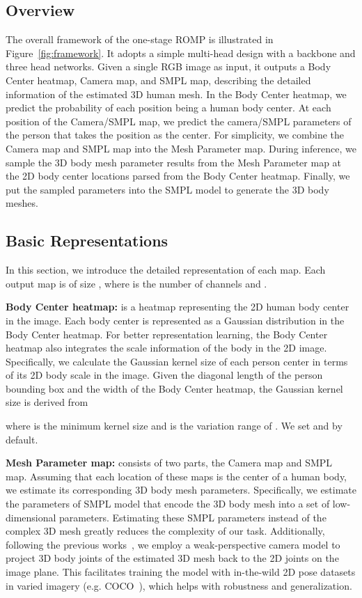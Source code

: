 \documentclass[10pt,twocolumn,letterpaper]{article}
\begin{document}
\subsection{Overview}
\vspace{-1mm}
The overall framework of the one-stage ROMP is illustrated in Figure~\ref{fig:framework}.
It adopts a simple multi-head design with a backbone and three head networks.
Given a single RGB image as input, it outputs a Body Center heatmap, Camera map, and SMPL map, describing the detailed information of the estimated 3D human mesh. 
In the Body Center heatmap, we predict the probability of each position being a human body center. 
At each position of the Camera/SMPL map, we predict the camera/SMPL parameters of the person that takes the position as the center. 
For simplicity, we combine the Camera map and SMPL map into the Mesh Parameter map. 
During inference, we sample the 3D body mesh parameter results from the Mesh Parameter map at the 2D body center locations parsed from the Body Center heatmap. 
Finally, we put the sampled parameters into the SMPL model to generate the 3D body meshes. 

\vspace{-1mm}
\subsection{Basic Representations~\label{sec:representations}}
\vspace{-1mm}

In this section, we introduce the detailed representation of each map. Each output map is of size , where  is the number of channels and . 

\textbf{Body Center heatmap:}  is a heatmap representing the 2D human body center in the image. 
Each body center is represented as a Gaussian distribution in the Body Center heatmap. 
For better representation learning, the Body Center heatmap also integrates the scale information of the body in the 2D image.
Specifically, we calculate the Gaussian kernel size  of each person center in terms of its 2D body scale in the image. 
Given the diagonal length   of the person bounding box and the width  of the Body Center heatmap, the Gaussian kernel size is derived from

where  is the minimum kernel size and  is the variation range of . We set  and   by default.

\textbf{Mesh Parameter map:}  consists of two parts, the Camera map and SMPL map.
Assuming that each location of these maps is the center of a human body, we estimate its corresponding 3D body mesh parameters.
Specifically, we estimate the parameters of SMPL model that encode the 3D body mesh into a set of low-dimensional parameters. 
Estimating these SMPL parameters instead of the complex 3D mesh greatly reduces the complexity of our task. 
Additionally, following the previous works~\cite{hmr,sun2019dsd-satn}, we employ a weak-perspective camera model to project  3D body joints  of the estimated 3D mesh back to the 2D joints   on the image plane. 
This facilitates training the model with in-the-wild 2D pose datasets in varied imagery (e.g. COCO~\cite{coco}), which helps with robustness and generalization.
 
\end{document}
